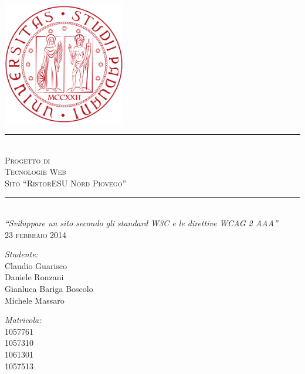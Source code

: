 \documentclass[10pt,a4paper,onecolumn]{article}
\begin{document}
\begin{titlepage}

\begin{center}
 
\textsc{\Large}\\[5cm]

\includegraphics[width=0.4\textwidth]{Logo.png}\\[0.3cm]  
\noindent\rule{\textwidth}{0.4pt} \\[0.3cm]
\textsc{\Huge Progetto di}\\[0.25cm]
\textsc{\Huge Tecnologie Web}\\[0.3cm]
\textsc{\Large Sito ``RistorESU Nord Piovego''}
\noindent\rule{\textwidth}{0.4pt}\\[0.5cm]
\textit{``Sviluppare un sito secondo gli standard W3C e le direttive WCAG 2 AAA''} \\[0.5cm]
\textsc{23 febbraio 2014}\\[0.5cm]
\begin{minipage}{0.4\textwidth}
\begin{flushleft} \large
\emph{Studente:}\\
Claudio Guarisco\\
Daniele Ronzani\\
Gianluca Bariga Boscolo\\
Michele Massaro
\end{flushleft}
\end{minipage}
\begin{minipage}{0.4\textwidth}
\begin{flushright} \large
\emph{Matricola:} \\
1057761\\
1057310\\
1061301\\
1057513\\
\end{flushright}
\end{minipage}
\end{center}
\end{titlepage}
\end{document}
